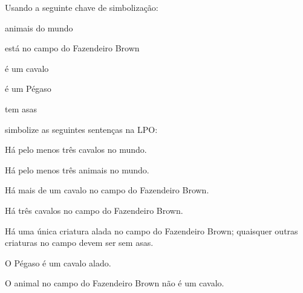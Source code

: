 \problempart
Usando a seguinte chave de simbolização:
\begin{ekey}
\item[\text{domínio}] animais do mundo
\item[\atom{B}{x}]  está no campo do Fazendeiro Brown
\item[\atom{H}{x}]  é um cavalo
\item[\atom{P}{x}]  é um Pégaso
\item[\atom{W}{x}]  tem asas
\end{ekey}
simbolize as seguintes sentenças na LPO:
\begin{compactlist}
\item Há pelo menos três cavalos no mundo.
\item[] 
\item Há pelo menos três animais no mundo.
\item[] 
\item Há mais de um cavalo no campo do Fazendeiro Brown.
\item[] 
\item Há três cavalos no campo do Fazendeiro Brown.
\item[] 
\item Há uma única criatura alada no campo do Fazendeiro Brown; quaisquer outras criaturas no campo devem ser sem asas.
\item[] 
\item O Pégaso é um cavalo alado.
\item[] 
\item O animal no campo do Fazendeiro Brown não é um cavalo.

\end{compactlist}
